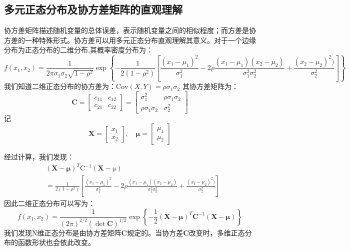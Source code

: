 \subsection{多元正态分布及协方差矩阵的直观理解}
协方差矩阵描述随机变量的总体误差，表示随机变量之间的相似程度；而方差是协方差的一种特殊形式。协方差可以用多元正态分布直观理解其意义。对于一个边缘分布为正态分布的二维分布,其概率密度分布为：
\begin{equation}
    f(x_1,x_2)=\frac{1}{2\pi\sigma_1\sigma_2\sqrt{1-\rho^2}}\exp
    \left\{ -\frac{1}{2(1-\rho^2)}\left[\frac{(x_1-\mu_1)^2}{\sigma^2_1}-2\rho\frac{(x_1-\mu_1)(x_2-\mu_2)}{\sigma_1^2\sigma_2^2}+\frac{(x_2-\mu_2)^2)}{\sigma^2_2}\right] \right\}
\end{equation}
我们知道二维正态分布的协方差为：$\mathrm{Cov}(X,Y)=\rho \sigma_1\sigma_2$
其协方差矩阵为：
$$\mathbf{C}=\left[
    \begin{matrix}
        c_{11} & c_{12} \\
        c_{21} & c_{22}
        \end{matrix}\right]=\left[
    \begin{matrix}
        \sigma_1^2 & \rho\sigma_1\sigma_2 \\
        \rho\sigma_1\sigma_2 & \sigma_2^2
    \end{matrix}
\right]$$
记$$\mathbf{X}=\left[
    \begin{matrix}
        x_1 \\
        x_2
    \end{matrix}\right],\quad
    \mathbf{\mu}=\left[
        \begin{matrix}
            \mu_1 \\
            \mu_2
        \end{matrix}\right]$$
    
经过计算，我们发现：
$$\begin{aligned}
    &(\mathbf{X}-\mathbf{\mu})^T \mathrm{C}^{-1}(\mathbf{X}-\mathrm{\mu})\\
    &=\frac{1}{2(1-\rho^2)}\left[\frac{(x_1-\mu_1)^2}{\sigma^2_1}-2\rho\frac{(x_1-\mu_1)(x_2-\mu_2)}{\sigma_1^2\sigma_2^2}+\frac{(x_2-\mu_2)^2)}{\sigma^2_2}\right] 
\end{aligned}$$
因此二维正态分布可以写为：
$$f(x_1,x_2)=\frac{1}{(2\pi)^{2/2}(\det\mathbf{C})^{1/2}}\exp\left\{
    -\frac{1}{2}(\mathbf{X}-\boldsymbol{\mu})^T \mathbf{C}^{-1}(\mathbf{X}-\boldsymbol{\mu})
\right\}$$
我们发现N维正态分布是由协方差矩阵$\mathbf{C}$规定的。当协方差$\mathbf{C}$改变时，多维正态分布的函数形状也会依此改变。

